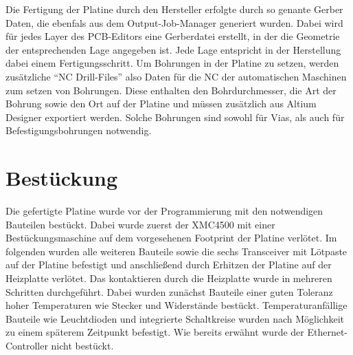 Die Fertigung der Platine durch den Hersteller erfolgte durch so genante Gerber Daten, die ebenfals aus dem Output-Job-Manager generiert wurden. Dabei wird für jedes Layer des \ac{PCB}-Editors eine Gerberdatei erstellt, in der die Geometrie der entsprechenden Lage angegeben ist. Jede Lage entspricht in der Herstellung dabei einem Fertigungsschritt. Um Bohrungen in der Platine zu setzen, werden zusätzliche \enquote{NC Drill-Files} also Daten für die \ac{NC} der automatischen Maschinen zum setzen von Bohrungen. Diese enthalten den Bohrdurchmesser, die Art der Bohrung sowie den Ort auf der Platine und müssen zusätzlich aus Altium Designer exportiert werden. Solche Bohrungen sind sowohl für Vias, als auch für Befestigungsbohrungen notwendig.


\section{Bestückung}
Die gefertigte Platine wurde vor der Programmierung mit den notwendigen Bauteilen bestückt. Dabei wurde zuerst der XMC4500 mit einer Bestückungsmaschine auf dem vorgesehenen Footprint der Platine verlötet. Im folgenden wurden alle weiteren Bauteile sowie die sechs Transceiver mit Lötpaste auf der Platine befestigt und anschließend durch Erhitzen der Platine auf der Heizplatte verlötet. Das kontaktieren durch die Heizplatte wurde in mehreren Schritten durchgeführt. Dabei wurden zunächst Bauteile einer guten Toleranz hoher Temperaturen wie Stecker und Widerstände bestückt. Temperaturanfällige Bauteile wie Leuchtdioden und integrierte Schaltkreise wurden nach Möglichkeit zu einem späterem Zeitpunkt befestigt. Wie bereits erwähnt wurde der Ethernet-Controller nicht bestückt.

